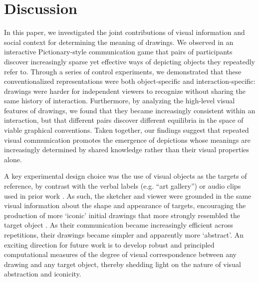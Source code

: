 \documentclass[10pt,letterpaper]{article}
\begin{document}
\section{Discussion}

In this paper, we investigated the joint contributions of visual information and social context for determining the meaning of drawings.
We observed in an interactive Pictionary-style communication game that pairs of participants discover increasingly sparse yet effective ways of depicting objects they repeatedly refer to.
Through a series of control experiments, we demonstrated that these conventionalized representations were both object-specific and interaction-specific: drawings were harder for independent viewers to recognize without sharing the same history of interaction.
Furthermore, by analyzing the high-level visual features of drawings, we found that they became increasingly consistent within an interaction, but that different pairs discover different equilibria in the space of viable graphical conventions.
Taken together, our findings suggest that repeated visual communication promotes the emergence of depictions whose meanings are increasingly determined by shared knowledge rather than their visual properties alone.

A key experimental design choice was the use of visual objects as the targets of reference, by contrast with the verbal labels (e.g. ``art gallery'') or audio clips used in prior work \cite{GalantucciGarrod11_ExperimentalSemiotics,fay2010interactive}. %
As such, the sketcher and viewer were grounded in the same visual information about the shape and appearance of targets, encouraging the production of more `iconic' initial drawings that more strongly resembled the target object \cite{verhoef2016iconicity,perlman2015iconicity}.
As their communication became increasingly efficient across repetitions, their drawings became simpler and apparently more `abstract'.
An exciting direction for future work is to develop robust and principled computational measures of the degree of visual correspondence between any drawing and any target object, thereby shedding light on the nature of visual abstraction and iconicity.
\end{document}
